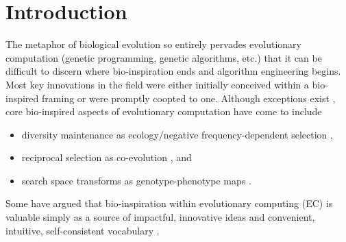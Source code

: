 % 

\section{Introduction} \label{sec:introduction}

The metaphor of biological evolution so entirely pervades evolutionary computation (genetic programming, genetic algorithms, etc.) that it can be difficult to discern where bio-inspiration ends and algorithm engineering begins.
Most key innovations in the field were either initially conceived within a bio-inspired framing or were promptly coopted to one.
Although exceptions exist \citep{TODO}, core bio-inspired aspects of evolutionary computation have come to include
\begin{itemize}
  \item diversity maintenance as ecology/negative frequency-dependent selection \citep{TODO},
  \item reciprocal selection as co-evolution \citep{TODO}, and
  \item search space transforms as genotype-phenotype maps \citep{TODO}.
\end{itemize}
Some have argued that bio-inspiration within evolutionary computing (EC) is valuable simply as a source of impactful, innovative ideas and convenient, intuitive, self-consistent vocabulary \citep{sorensen2015metaheuristics,banzhaf2006artificial}.

